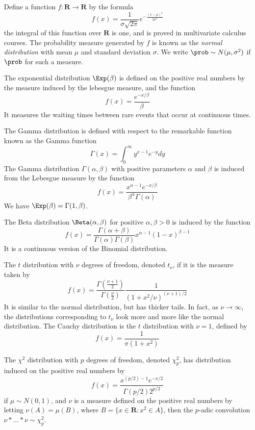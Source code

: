 \begin{example}
    Define a function $f:\mathbf{R} \to \mathbf{R}$ by the formula
    \[ f(x) = \frac{1}{\sigma \sqrt{2\pi}} e^{-\frac{(x - \mu)^2}{2\sigma^2}} \]
    the integral of this function over $\mathbf{R}$ is one, and is proved in multivariate calculus courses. The probability measure generated by $f$ is known as the \emph{normal distribution} with mean $\mu$ and standard deviation $\sigma$. We write $\prob \sim N(\mu, \sigma^2)$ if $\prob$ for such a measure.
\end{example}

\begin{example}
    The exponential distribution $\Exp(\beta)$ is defined on the positive real numbers by the measure induced by the lebesgue measure, and the function
    \[ f(x) = \frac{e^{-x/\beta}}{\beta} \]
    It measures the waiting times between rare events that occur at continuous times.
\end{example}

\begin{example}
    The Gamma distribution is defined with respect to the remarkable function known as the Gamma function
    \[ \Gamma(x) = \int_0^\infty y^{x-1} e^{-y} dy \]
    The Gamma distribution $\Gamma(\alpha, \beta)$ with positive parameters $\alpha$ and $\beta$ is induced from the Lebesgue measure by the function
    \[ f(x) = \frac{x^{\alpha-1} e^{-x/\beta}}{\beta^\alpha \Gamma(\alpha)} \]
    We have $\Exp(\beta) = \Gamma(1,\beta)$.
\end{example}

\begin{example}
    The Beta distribution $\Beta(\alpha, \beta)$ for positive $\alpha, \beta > 0$ is induced by the function
    \[ f(x) = \frac{\Gamma(\alpha + \beta)}{\Gamma(\alpha) \Gamma(\beta)} x^{\alpha-1} (1 - x)^{\beta - 1} \]
    It is a continuous version of the Binomial distribution.
\end{example}

\begin{example}
    The $t$ distribution with $\nu$ degrees of freedom, denoted $t_\nu$, if it is the measure taken by
    \[ f(x) = \frac{\Gamma(\frac{\nu + 1}{2})}{\Gamma(\frac{\nu}{2})} \frac{1}{(1 + x^2/\nu)^{(\nu+1)/2}} \]
    It is similar to the normal distribution, but has thicker tails. In fact, as $\nu \to \infty$, the distributions corresponding to $t_\nu$ look more and more like the normal distribution. The Cauchy distribution is the $t$ distribution with $\nu = 1$, defined by
    \[ f(x) = \frac{1}{\pi(1 + x^2)} \]
\end{example}

\begin{example}
    The $\chi^2$ distribution with $p$ degrees of freedom, denoted $\chi_p^2$, has distribution induced on the positive real numbers by
    \[ f(x) = \frac{x^{(p/2) - 1} e^{-x/2}}{\Gamma(p/2) 2^{p/2}} \]
    if $\mu \sim N(0, 1)$, and $\nu$ is a measure defined on the positive real numbers by letting $\nu(A) = \mu(B)$, where $B = \{ x \in \mathbf{R}: x^2 \in A \}$, then the $p$-adic convolution $\nu * \dots * \nu \sim \chi_p^2$.
\end{example}